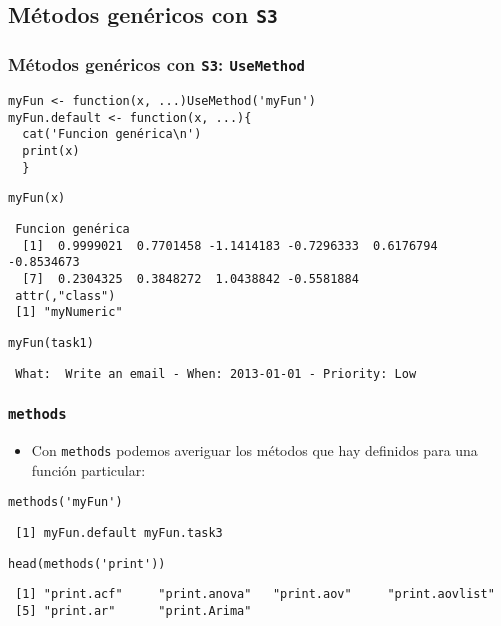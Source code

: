 \documentclass[xcolor={usenames,svgnames,dvipsnames}]{beamer}
\begin{document}
\subsection{Métodos genéricos con \texttt{S3}}
\label{sec-2-3}
\begin{frame}[fragile]
\frametitle{Métodos genéricos con \texttt{S3}: \texttt{UseMethod}}
\label{sec-2-3-1}


\lstset{language=R}
\begin{lstlisting}
myFun <- function(x, ...)UseMethod('myFun')
myFun.default <- function(x, ...){
  cat('Funcion genérica\n')
  print(x)
  }
\end{lstlisting}



\lstset{language=R}
\begin{lstlisting}
myFun(x)
\end{lstlisting}

\begin{verbatim}
 Funcion genérica
  [1]  0.9999021  0.7701458 -1.1414183 -0.7296333  0.6176794 -0.8534673
  [7]  0.2304325  0.3848272  1.0438842 -0.5581884
 attr(,"class")
 [1] "myNumeric"
\end{verbatim}


\lstset{language=R}
\begin{lstlisting}
myFun(task1)
\end{lstlisting}

\begin{verbatim}
 What:  Write an email - When: 2013-01-01 - Priority: Low
\end{verbatim}
\end{frame}
\begin{frame}[fragile]
\frametitle{\texttt{methods}}
\label{sec-2-3-2}

\begin{itemize}
\item Con \texttt{methods} podemos averiguar los métodos que hay definidos para una función particular:
\end{itemize}

\lstset{language=R}
\begin{lstlisting}
methods('myFun')
\end{lstlisting}

\begin{verbatim}
 [1] myFun.default myFun.task3
\end{verbatim}


\lstset{language=R}
\begin{lstlisting}
head(methods('print'))
\end{lstlisting}

\begin{verbatim}
 [1] "print.acf"     "print.anova"   "print.aov"     "print.aovlist"
 [5] "print.ar"      "print.Arima"
\end{verbatim}
\end{frame}
\end{document}
